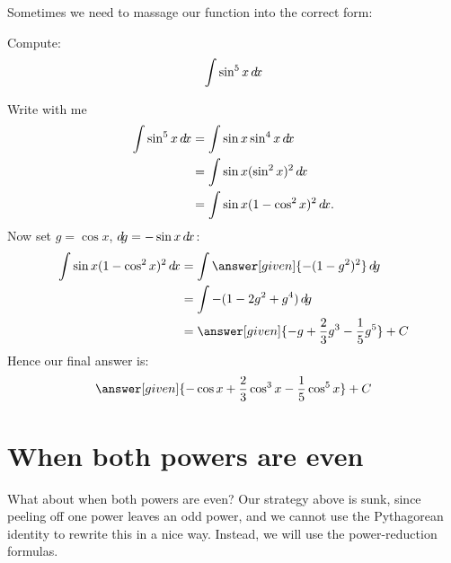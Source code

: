 \documentclass{ximera}
\begin{document}
Sometimes we need to massage our function into the correct form:

\begin{example}
  Compute:
  \[
  \int \sin^5 x \mathop{}\!d\! x
  \]
  \begin{explanation}
    Write with me
    \begin{align*}
      \int \sin^5 x\d x &=\int \sin x \sin^4 x\d x\\
      &= \int \sin x (\sin^2 x)^2\d x\\
      &= \int \sin x (1-\cos^2 x)^2\d x.
    \end{align*}
    Now set $g=\cos x$, $\mathop{}\!d\! g=-\sin x\mathop{}\!d\! x$:
    \begin{align*}
      \int \sin x (1-\cos^2 x)^2\d x&=\int \answer[given]{-(1-g^2)^2} \d g \\
      &=\int -(1-2g^2+g^4)\d g \\
      &=\answer[given]{-g+\frac{2}{3}g^3-\frac{1}{5}g^5}+C
    \end{align*}
    Hence our final answer is:
    \[
    \answer[given]{-\cos x+\frac{2}{3}\cos^3 x-\frac{1}{5}\cos^5x}+C
    \]
  \end{explanation}
\end{example}



\section{When both powers are even}

What about when both powers are even?  Our strategy above is sunk,
since peeling off one power leaves an odd power, and we cannot use the
Pythagorean identity to rewrite this in a nice way.  Instead, we will
use the power-reduction formulas.
\end{document}

